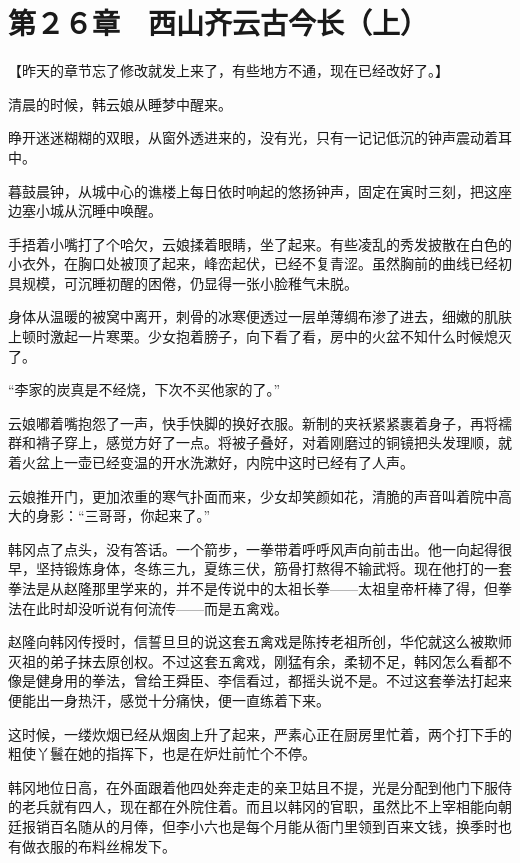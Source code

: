 \section{第２６章　西山齐云古今长（上）}

【昨天的章节忘了修改就发上来了，有些地方不通，现在已经改好了。】

清晨的时候，韩云娘从睡梦中醒来。

睁开迷迷糊糊的双眼，从窗外透进来的，没有光，只有一记记低沉的钟声震动着耳中。

暮鼓晨钟，从城中心的谯楼上每日依时响起的悠扬钟声，固定在寅时三刻，把这座边塞小城从沉睡中唤醒。

手捂着小嘴打了个哈欠，云娘揉着眼睛，坐了起来。有些凌乱的秀发披散在白色的小衣外，在胸口处被顶了起来，峰峦起伏，已经不复青涩。虽然胸前的曲线已经初具规模，可沉睡初醒的困倦，仍显得一张小脸稚气未脱。

身体从温暖的被窝中离开，刺骨的冰寒便透过一层单薄绸布渗了进去，细嫩的肌肤上顿时激起一片寒栗。少女抱着膀子，向下看了看，房中的火盆不知什么时候熄灭了。

“李家的炭真是不经烧，下次不买他家的了。”

云娘嘟着嘴抱怨了一声，快手快脚的换好衣服。新制的夹袄紧紧裹着身子，再将襦群和褙子穿上，感觉方好了一点。将被子叠好，对着刚磨过的铜镜把头发理顺，就着火盆上一壶已经变温的开水洗漱好，内院中这时已经有了人声。

云娘推开门，更加浓重的寒气扑面而来，少女却笑颜如花，清脆的声音叫着院中高大的身影：“三哥哥，你起来了。”

韩冈点了点头，没有答话。一个箭步，一拳带着呼呼风声向前击出。他一向起得很早，坚持锻炼身体，冬练三九，夏练三伏，筋骨打熬得不输武将。现在他打的一套拳法是从赵隆那里学来的，并不是传说中的太祖长拳——太祖皇帝杆棒了得，但拳法在此时却没听说有何流传——而是五禽戏。

赵隆向韩冈传授时，信誓旦旦的说这套五禽戏是陈抟老祖所创，华佗就这么被欺师灭祖的弟子抹去原创权。不过这套五禽戏，刚猛有余，柔韧不足，韩冈怎么看都不像是健身用的拳法，曾给王舜臣、李信看过，都摇头说不是。不过这套拳法打起来便能出一身热汗，感觉十分痛快，便一直练着下来。

这时候，一缕炊烟已经从烟囱上升了起来，严素心正在厨房里忙着，两个打下手的粗使丫鬟在她的指挥下，也是在炉灶前忙个不停。

韩冈地位日高，在外面跟着他四处奔走走的亲卫姑且不提，光是分配到他门下服侍的老兵就有四人，现在都在外院住着。而且以韩冈的官职，虽然比不上宰相能向朝廷报销百名随从的月俸，但李小六也是每个月能从衙门里领到百来文钱，换季时也有做衣服的布料丝棉发下。

